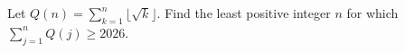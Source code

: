 Let $Q(n)=\sum_{k=1}^n\lfloor\sqrt{k}\rfloor$. Find the least positive integer $n$ for which $\sum_{j=1}^nQ(j)\ge2026$.
